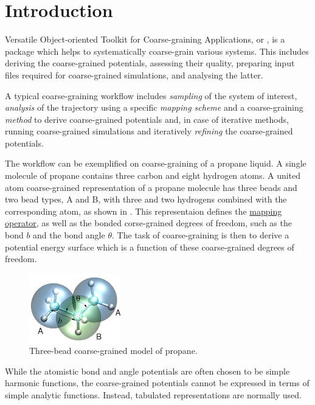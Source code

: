 \chapter{Introduction}

\denis

Versatile Object-oriented Toolkit for Coarse-graining Applications, or \votca, is a package which helps to systematically coarse-grain various systems. This includes  deriving the coarse-grained potentials, assessing their quality, preparing input files required for coarse-grained simulations, and analysing the latter. 

A typical coarse-graining workflow includes {\em sampling} of the system of interest, {\em analysis} of the trajectory using a specific {\em mapping scheme} and a coarse-graining {\em method} to derive coarse-grained potentials and, in case of iterative methods, running coarse-grained simulations and iteratively {\em refining} the coarse-grained potentials.

The workflow can be exemplified on coarse-graining of a propane liquid. A single molecule of propane contains three carbon and eight hydrogen atoms. A united atom coarse-grained representation of a propane molecule has three beads and two bead types, A and B, with three and two hydrogens combined with the corresponding atom, as shown in . This representaion defines the \hyperref[sec:mapping_operator]{mapping operator}, as well as the bonded corse-grained degrees of freedom, such as the bond $b$ and the bond angle $\theta$. The task of coarse-graining is then to derive a potential energy surface which is a function of these coarse-grained degrees of freedom.

\begin{figure}
 \includegraphics[width=4cm]{fig/propane}
 \caption{\small Three-bead coarse-grained model of propane.
 \label{fig:intro:propane}
}
\end{figure}

While the atomistic bond and angle potentials are often chosen to be simple harmonic functions, the coarse-grained potentials cannot be expressed in terms of simple analytic functions. Instead, tabulated representations are normally used. 

